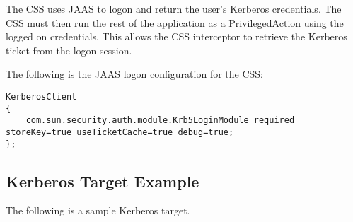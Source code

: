 The CSS uses JAAS to logon and return the user's Kerberos credentials.
The CSS must then run the rest of the application as a PrivilegedAction using
the logged on credentials. This allows the CSS interceptor to retrieve the
Kerberos ticket from the logon session.

The following is the JAAS logon configuration for the CSS:

\begin{scriptsize}
\begin{verbatim}
KerberosClient 
{
    com.sun.security.auth.module.Krb5LoginModule required storeKey=true useTicketCache=true debug=true;
};
\end{verbatim}
\end{scriptsize}


\subsection{Kerberos Target Example}

The following is a sample Kerberos target.

